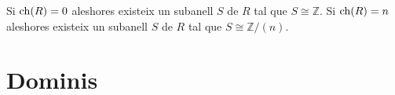 \documentclass[../Apunts.tex]{subfiles}
\begin{document}
	\begin{corollary}
		\label{corollary:subcos isomorf respecte caracteristica}
		Si \(\operatorname{ch}(R)=0\) aleshores existeix un subanell \(S\) de \(R\) tal que \(S\cong\mathbb{Z}\). Si \(\operatorname{ch}(R)=n\) aleshores existeix un subanell \(S\) de \(R\) tal que \(S\cong\mathbb{Z}/(n)\).
	\end{corollary}
	\section{Dominis}
\end{document}
